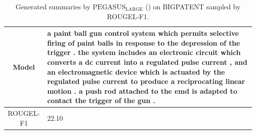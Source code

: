 \begin{table}[bth!]
\begin{tabular}{c|p{}}
Model & 
a paint ball gun control system which permits selective firing of paint balls in response to the depression of the trigger . the system includes an electronic circuit which converts a dc current into a regulated pulse current , and an electromagnetic device which is actuated by the regulated pulse current to produce a reciprocating linear motion . a push rod attached to the emd is adapted to contact the trigger of the gun .
\\ \hline
ROUGEL-F1 & 
22.10
\\ \hline
\end{tabular}
\caption{Generated summaries by $\text{PEGASUS}_{\text{LARGE}}$ (\gnews) on BIGPATENT sampled by ROUGEL-F1.}
\end{table}
